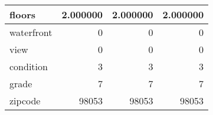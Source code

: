 \begin{table}[H]
\begin{tabular}{|l|r|r|r|}
\hline floors & \cellcolor[rgb]{0.9, 0.54, 0.52} 2.000000 & \cellcolor[rgb]{0.9, 0.54, 0.52} 2.000000 & \cellcolor[rgb]{0.9, 0.54, 0.52} 2.000000 \\
\hline waterfront & \cellcolor[rgb]{0.9, 0.54, 0.52} 0 & \cellcolor[rgb]{0.9, 0.54, 0.52} 0 & \cellcolor[rgb]{0.9, 0.54, 0.52} 0 \\
\hline view & \cellcolor[rgb]{0.9, 0.54, 0.52} 0 & \cellcolor[rgb]{0.9, 0.54, 0.52} 0 & \cellcolor[rgb]{0.9, 0.54, 0.52} 0 \\
\hline condition & \cellcolor[rgb]{0.9, 0.54, 0.52} 3 & \cellcolor[rgb]{0.9, 0.54, 0.52} 3 & \cellcolor[rgb]{0.9, 0.54, 0.52} 3 \\
\hline grade & \cellcolor[rgb]{0.9, 0.54, 0.52} 7 & \cellcolor[rgb]{0.9, 0.54, 0.52} 7 & \cellcolor[rgb]{0.9, 0.54, 0.52} 7 \\
\hline zipcode & \cellcolor[rgb]{0.9, 0.54, 0.52} 98053 & \cellcolor[rgb]{0.9, 0.54, 0.52} 98053 & \cellcolor[rgb]{0.9, 0.54, 0.52} 98053 \\
\hline
\end{tabular}
\end{table}

